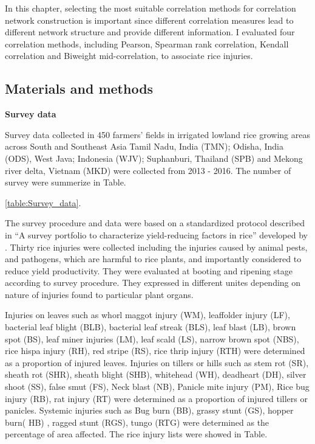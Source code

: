 In this chapter, selecting the most suitable correlation methods for correlation network construction is important since different correlation measures lead to different network structure and provide different information. I evaluated four correlation methods, including Pearson, Spearman rank correlation, Kendall correlation \citep{Prokhorov_2001_Kendall} and Biweight mid-correlation, to associate rice injuries. 

\subsection*{Materials and methods}
\textbf{Survey data}

Survey data collected in 450 farmers’ fields in irrigated lowland rice growing areas across South and Southeast Asia Tamil Nadu, India (TMN); Odisha, India (ODS), West Java; Indonesia (WJV); Suphanburi, Thailand (SPB) and Mekong river delta, Vietnam (MKD) were collected from 2013 - 2016. The number of survey were summerize in Table.

\ref{table:Survey_data}.

The survey procedure and data were based on a standardized protocol described in ``A survey portfolio to characterize yield-reducing factors in rice'' developed by \citet{Savary_2009_Survey}. Thirty rice injuries were collected 
including the injuries caused by animal pests, and pathogens, which are harmful to rice plants, and importantly considered to reduce yield productivity. They were evaluated at booting and ripening stage according to survey procedure. They expressed in different unites depending on nature of injuries found to particular plant organs. 

Injuries on leaves such as whorl maggot injury (WM), leaffolder injury (LF), bacterial leaf blight (BLB), bacterial leaf streak (BLS), leaf blast (LB), brown spot (BS), leaf miner injuries (LM), leaf scald (LS), narrow brown spot (NBS), rice hispa injury (RH), red stripe (RS), rice thrip injury (RTH) were determined as a proportion of injured leaves. Injuries on tillers or hills such as stem rot (SR), sheath rot (SHR), sheath blight (SHB), whitehead (WH), deadheart (DH), silver shoot (SS), false smut (FS), Neck blast (NB), Panicle mite injury (PM), Rice bug injury (RB), rat injury (RT) were determined as a proportion of injured tillers or panicles. Systemic injuries such as Bug burn (BB), grassy stunt (GS), hopper burn( HB)  , ragged stunt (RGS), tungo (RTG) were determined as the percentage of area affected. The rice injury lists were showed in Table.

